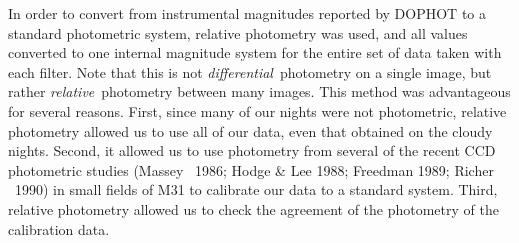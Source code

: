 \documentclass{article}
\begin{document}
In order to convert from instrumental magnitudes reported by DOPHOT
to a standard photometric system, relative photometry was used, and
all values converted to one internal magnitude system for the entire
set of data taken with each filter.  Note that this is not {\em
  differential}\ photometry on a single image, but rather {\em
  relative}\ photometry between many images.  This method was
advantageous for several reasons.  First, since many of our nights
were not photometric, relative photometry allowed us to use all of our
data, even that obtained on the cloudy nights.  Second, it allowed us
to use photometry from several of the recent CCD photometric studies
(Massey \etal\ 1986; Hodge \& Lee 1988; Freedman 1989; Richer \etal\ 
1990) in small fields of M31 to calibrate our data to a standard
system.  Third, relative photometry allowed us to check the agreement
of the photometry of the calibration data.
\end{document}
